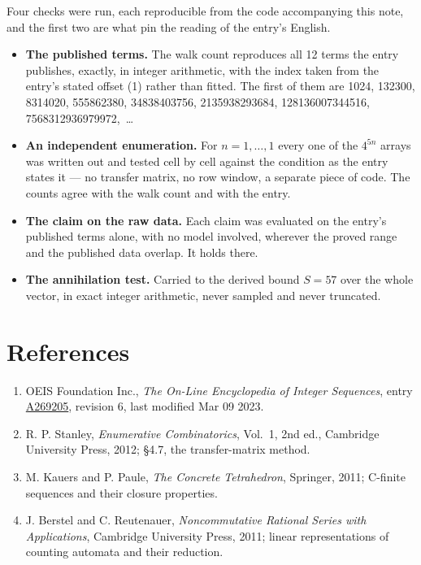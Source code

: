 \documentclass[11pt]{article}
\theoremstyle{definition}
\begin{document}
Four checks were run, each reproducible from the code accompanying this note, and the first two are what pin the reading of the entry's English.

\begin{itemize}

\item {\bfseries The published terms.} The walk count reproduces all 12 terms the entry publishes, exactly, in integer arithmetic, with the index taken from the entry's stated offset (1) rather than fitted. The first of them are 1024, 132300, 8314020, 555862380, 34838403756, 2135938293684, 128136007344516, 7568312936979972,~\dots

\item {\bfseries An independent enumeration.} For $n = 1,\dots,1$ every one of the $4^{5n}$ arrays was written out and tested cell by cell against the condition as the entry states it --- no transfer matrix, no row window, a separate piece of code. The counts agree with the walk count and with the entry.

\item {\bfseries The claim on the raw data.} Each claim was evaluated on the entry's published terms alone, with no model involved, wherever the proved range and the published data overlap. It holds there.

\item {\bfseries The annihilation test.} Carried to the derived bound $S = 57$ over the whole vector, in exact integer arithmetic, never sampled and never truncated.

\end{itemize}

\section{References}

\begin{enumerate}

\item OEIS Foundation Inc., \emph{The On-Line Encyclopedia of Integer Sequences}, entry \href{https://oeis.org/A269205}{A269205}, revision 6, last modified Mar 09 2023.

\item R. P. Stanley, \emph{Enumerative Combinatorics}, Vol.~1, 2nd ed., Cambridge University Press, 2012; \S4.7, the transfer-matrix method.

\item M. Kauers and P. Paule, \emph{The Concrete Tetrahedron}, Springer, 2011; C-finite sequences and their closure properties.

\item J. Berstel and C. Reutenauer, \emph{Noncommutative Rational Series with Applications}, Cambridge University Press, 2011; linear representations of counting automata and their reduction.

\end{enumerate}
\end{document}
